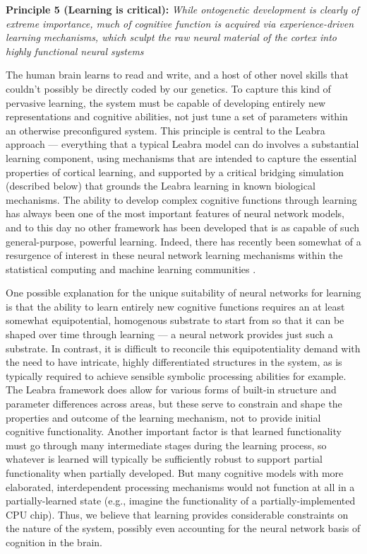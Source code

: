 \documentclass[11pt,twoside]{article}
\begin{document}
{\bf Principle 5 (Learning is critical):} {\em While ontogenetic development
  is clearly of extreme importance, much of cognitive function is acquired via
  experience-driven learning mechanisms, which sculpt the raw neural material
  of the cortex into highly functional neural systems}

The human brain learns to read and write, and a host of other novel skills
that couldn't possibly be directly coded by our genetics.  To capture this
kind of pervasive learning, the system must be capable of developing entirely
new representations and cognitive abilities, not just tune a set of parameters
within an otherwise preconfigured system.  This principle is central to the
Leabra approach --- everything that a typical Leabra model can do involves a
substantial learning component, using mechanisms that are intended to capture
the essential properties of cortical learning, and supported by a critical
bridging simulation (described below) that grounds the Leabra learning in
known biological mechanisms.  The ability to develop complex cognitive
functions through learning has always been one of the most important features
of neural network models, and to this day no other framework has been
developed that is as capable of such general-purpose, powerful learning.
Indeed, there has recently been somewhat of a resurgence of interest in these
neural network learning mechanisms within the statistical computing and
machine learning communities \cite{RBM,schmidhuber,undirectedbayes,etc}.  

One possible explanation for the unique suitability of neural networks for
learning is that the ability to learn entirely new cognitive functions
requires an at least somewhat equipotential, homogenous substrate to start
from so that it can be shaped over time through learning --- a neural network
provides just such a substrate.  In contrast, it is difficult to reconcile
this equipotentiality demand with the need to have intricate, highly
differentiated structures in the system, as is typically required to achieve
sensible symbolic processing abilities for example.  The Leabra framework does
allow for various forms of built-in structure and parameter differences across
areas, but these serve to constrain and shape the properties and outcome of
the learning mechanism, not to provide initial cognitive functionality.
Another important factor is that learned functionality must go through many
intermediate stages during the learning process, so whatever is learned will
typically be sufficiently robust to support partial functionality when
partially developed.  But many cognitive models with more elaborated,
interdependent processing mechanisms would not function at all in a
partially-learned state (e.g., imagine the functionality of a
partially-implemented CPU chip).  Thus, we believe that learning provides
considerable constraints on the nature of the system, possibly even
accounting for the neural network basis of cognition in the brain.
\end{document}
